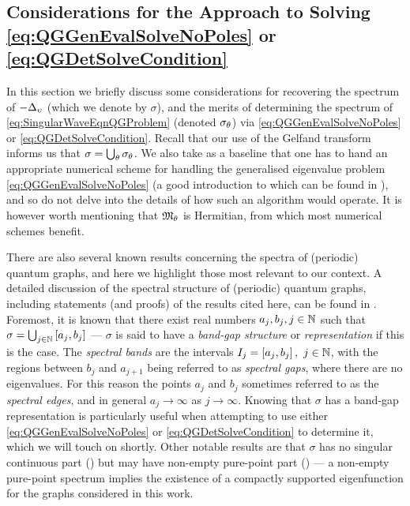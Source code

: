 \subsection{Considerations for the Approach to Solving \eqref{eq:QGGenEvalSolveNoPoles} or \eqref{eq:QGDetSolveCondition}} \label{ssec:ApproachConsiderations}
In this section we briefly discuss some considerations for recovering the spectrum of $-\Delta_{\upsilon}$ (which we denote by $\sigma$), and the merits of determining the spectrum of \eqref{eq:SingularWaveEqnQGProblem} (denoted $\sigma_\theta$) via \eqref{eq:QGGenEvalSolveNoPoles} or \eqref{eq:QGDetSolveCondition}.
Recall that our use of the Gelfand transform informs us that $\sigma = \bigcup_{\theta}\sigma_{\theta}$.
We also take as a baseline that one has to hand an appropriate numerical scheme for handling the generalised eigenvalue problem \eqref{eq:QGGenEvalSolveNoPoles} (a good introduction to which can be found in \cite{guttel2017nonlinear}), and so do not delve into the details of how such an algorithm would operate.
It is however worth mentioning that $\mathfrak{M}_\theta$ is Hermitian, from which most numerical schemes benefit.

There are also several known results concerning the spectra of (periodic) quantum graphs, and here we highlight those most relevant to our context. 
A detailed discussion of the spectral structure of (periodic) quantum graphs, including statements (and proofs) of the results cited here, can be found in \cite[Chapter 4]{berkolaiko2013introduction}.
Foremost, it is known that there exist real numbers $a_j, b_j, j\in\mathbb{N}$ such that $\sigma = \bigcup_{j\in\mathbb{N}}\left[ a_j,b_j \right]$ --- $\sigma$ is said to have a \emph{band-gap structure} or \emph{representation} \cite[Chapter 4.3]{berkolaiko2013introduction} if this is the case.
The \emph{spectral bands} are the intervals $I_j=\left[ a_j,b_j \right], \ j\in\mathbb{N}$, with the regions between $b_j$ and $a_{j+1}$ being referred to as \emph{spectral gaps}, where there are no eigenvalues.
For this reason the points $a_j$ and $b_j$ sometimes referred to as the \emph{spectral edges}, and in general $a_j\rightarrow\infty$ as $j\rightarrow\infty$.
Knowing that $\sigma$ has a band-gap representation is particularly useful when attempting to use either \eqref{eq:QGGenEvalSolveNoPoles} or \eqref{eq:QGDetSolveCondition} to determine it, which we will touch on shortly.
Other notable results are that $\sigma$ has no singular continuous part (\cite[Chapter 4.4]{berkolaiko2013introduction}) but may have non-empty pure-point part (\cite[Chapter 4.5]{berkolaiko2013introduction}) --- a non-empty pure-point spectrum implies the existence of a compactly supported eigenfunction for the graphs considered in this work.

